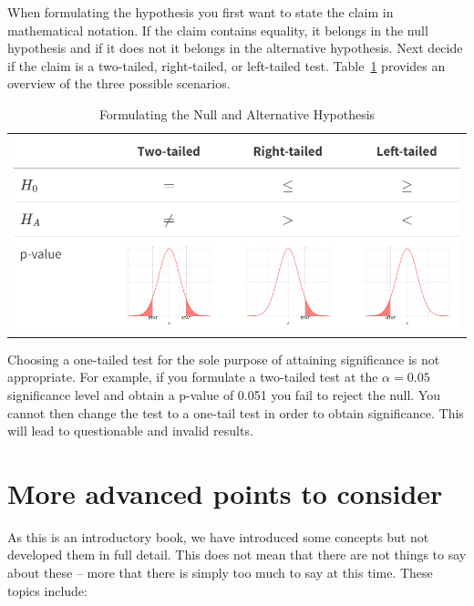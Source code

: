 \documentclass[
  letterpaper,
  DIV=11,
  numbers=noendperiod]{scrreprt}
\theoremstyle{definition}
\theoremstyle{remark}
\begin{document}
When formulating the hypothesis you first want to state the claim in
mathematical notation. If the claim contains equality, it belongs in the
null hypothesis and if it does not it belongs in the alternative
hypothesis. Next decide if the claim is a two-tailed, right-tailed, or
left-tailed test. Table~\ref{tbl-tail-ch-12} provides an overview of the
three possible scenarios.

\hypertarget{tbl-tail-ch-12}{}
\begin{longtable}[]{@{}l@{}}
\caption{\label{tbl-tail-ch-12}Formulating the Null and Alternative
Hypothesis}\tabularnewline
\toprule\noalign{}
\endfirsthead
\endhead
\bottomrule\noalign{}
\endlastfoot
\includegraphics{images/ch12_tails.png} \\
\end{longtable}

Choosing a one-tailed test for the sole purpose of attaining
significance is not appropriate. For example, if you formulate a
two-tailed test at the \(\alpha = 0.05\) significance level and obtain a
p-value of 0.051 you fail to reject the null. You cannot then change the
test to a one-tail test in order to obtain significance. This will lead
to questionable and invalid results.

\hypertarget{more-advanced-points-to-consider}{%
\section{More advanced points to
consider}\label{more-advanced-points-to-consider}}

As this is an introductory book, we have introduced some concepts but
not developed them in full detail. This does not mean that there are not
things to say about these -- more that there is simply too much to say
at this time. These topics include:
\end{document}
